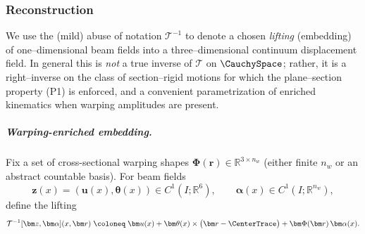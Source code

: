 \subsubsection{Reconstruction}

We use the (mild) abuse of notation $\mathcal T^{-1}$ to denote a chosen
\emph{lifting} (embedding) of one--dimensional beam fields into a three--dimensional
continuum displacement field.  In general this is \emph{not} a true inverse of $\mathcal T$ on
$\CauchySpace$; rather, it is a right--inverse on the class of section--rigid
motions for which the plane--section property (P1) is enforced, and a convenient
parametrization of enriched kinematics when warping amplitudes are present.

\subparagraph{Warping-enriched embedding.}
Fix a set of cross-sectional warping shapes $\bm\Phi(\bm r)\in\mathbb R^{3\times n_w}$
(either finite $n_w$ or an abstract countable basis).
For beam fields
\[
  \bm z(x)=(\bm u(x),\bm\theta(x))\in C^1(I;\mathbb R^6),
  \qquad
  \bm\alpha(x)\in C^1(I;\mathbb R^{n_w}),
\]
define the lifting
\begin{equation*}
\mathcal T^{-1}[\bm z,\bm\alpha](x,\bm r)
\;\coloneq\;
\bm u(x)
+\bm\theta(x)\times\bigl(\bm r-\CenterTrace\bigr)
+\bm\Phi(\bm r)\,\bm\alpha(x).
\end{equation*}


